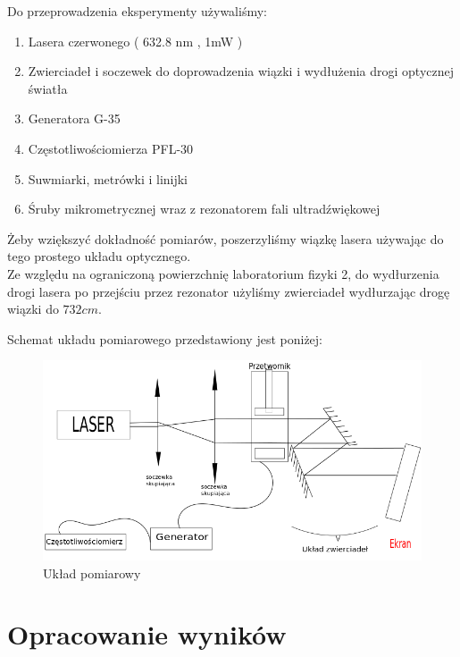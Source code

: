 \documentclass[a4paper,12pt]{article}
\begin{document}

Do przeprowadzenia eksperymenty używaliśmy: 

\begin{enumerate}
  \item Lasera czerwonego ( 632.8 nm , 1mW ) 
  \item Zwierciadeł i soczewek do doprowadzenia wiązki i wydłużenia drogi optycznej światła
  \item Generatora G-35
  \item Częstotliwościomierza PFL-30
  \item Suwmiarki, metrówki i linijki  
  \item Śruby mikrometrycznej wraz z rezonatorem fali ultradźwiękowej
\end{enumerate}

Żeby wziększyć dokładność pomiarów, poszerzyliśmy wiązkę lasera używając do tego prostego układu optycznego.\\
Ze względu na ograniczoną powierzchnię laboratorium fizyki 2, do wydłurzenia drogi lasera po przejściu przez rezonator użyliśmy zwierciadeł wydłurzając drogę wiązki do $732cm$. 

Schemat układu pomiarowego przedstawiony jest poniżej: 

\begin{figure} [H]
  \begin{center}
    \includegraphics[width = 15cm]{Rysunek.png}
    \caption{Układ pomiarowy}
  \end{center}
\end{figure}



\section{Opracowanie wyników}
\end{document}
